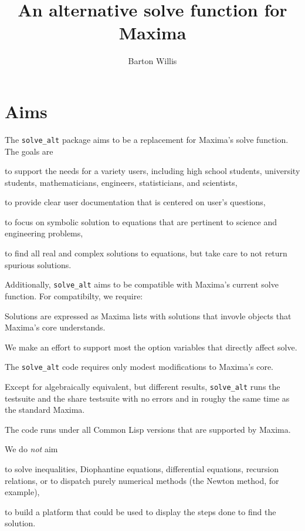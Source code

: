 \documentclass[]{scrartcl}
\title{An alternative solve function for Maxima}
\author{Barton Willis}
\newcommand{\altsolve}{\texttt{solve\_alt}}
\begin{document}
\maketitle

\section{Aims}


The \altsolve\/ package aims to be a replacement for Maxima's solve function. The goals are

\begin{alphalist}[]

\item to support the needs for a variety users, including high school students, university students, mathematicians, engineers, statisticians, and scientists,

\item to provide clear user documentation that is centered  on user's questions,

\item to focus on symbolic solution to equations that are pertinent to science and engineering problems,

\item to find all real and complex solutions to equations, but take care to not return spurious solutions.

\end{alphalist}
Additionally, \altsolve\/  aims to be compatible with Maxima's current solve function. For compatibilty, we require:

\begin{alphalist}[]

\item Solutions are expressed as Maxima lists with solutions that invovle objects that Maxima's core  understands.

\item We make an effort to support most the option variables that directly affect solve.

 \item The \altsolve\/ code requires only modest modifications to Maxima's core.

\item Except for algebraically equivalent, but different results, \altsolve\/  runs the testsuite and the share testsuite with no errors and in roughy the same time as the standard Maxima.

\item The code runs under all Common Lisp versions that are supported by Maxima.
\end{alphalist}
We do \emph{not} aim
\begin{alphalist}[]

\item to solve inequalities, Diophantine equations, differential equations, recursion relations, or to dispatch purely numerical methods (the Newton method, for example),

\item to build a platform that could be used to display the steps done to find the solution.

\end{alphalist}
\end{document}
